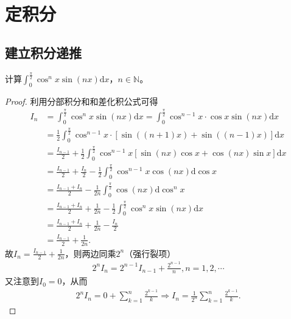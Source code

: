 \documentclass[../../main.tex]{subfiles}
\begin{document}
\section{定积分}

\subsection{建立积分递推}

\begin{example}
计算\(\int_{0}^{\frac{\pi}{2}} \cos^{n}x\sin(nx)\mathrm{d}x\)，\(n \in \mathbb{N}\)。 
\end{example}
\begin{proof}
利用分部积分和和差化积公式可得
\begin{align*}
I_n&=\int_0^{\frac{\pi}{2}}\cos ^nx\sin(nx) \mathrm{d}x=\int_0^{\frac{\pi}{2}}\cos ^{n - 1}x\cdot\cos x\sin(nx) \mathrm{d}x\\
&=\frac{1}{2}\int_0^{\frac{\pi}{2}}\cos ^{n - 1}x\cdot[\sin((n + 1)x)+\sin((n - 1)x)] \mathrm{d}x\\
&=\frac{I_{n - 1}}{2}+\frac{1}{2}\int_0^{\frac{\pi}{2}}\cos ^{n - 1}x[\sin(nx)\cos x+\cos(nx)\sin x] \mathrm{d}x\\
&=\frac{I_{n - 1}}{2}+\frac{I_n}{2}-\frac{1}{2}\int_0^{\frac{\pi}{2}}\cos ^{n - 1}x\cos(nx) \mathrm{d}\cos x\\
&=\frac{I_{n - 1}+I_n}{2}-\frac{1}{2n}\int_0^{\frac{\pi}{2}}\cos(nx) \mathrm{d}\cos ^nx\\
&=\frac{I_{n - 1}+I_n}{2}+\frac{1}{2n}-\frac{1}{2}\int_0^{\frac{\pi}{2}}\cos ^nx\sin(nx) \mathrm{d}x\\
&=\frac{I_{n - 1}+I_n}{2}+\frac{1}{2n}-\frac{I_n}{2}\\
&=\frac{I_{n - 1}}{2}+\frac{1}{2n}.
\end{align*}
故\(I_n=\frac{I_{n - 1}}{2}+\frac{1}{2n}\)，则两边同乘\(2^n\)（强行裂项）
\begin{align*}
2^nI_n = 2^{n - 1}I_{n - 1}+\frac{2^{n - 1}}{n},n = 1,2,\cdots
\end{align*}
又注意到\(I_0 = 0\)，从而
\begin{align*}
2^nI_n = 0+\sum_{k = 1}^n\frac{2^{k - 1}}{k}\Rightarrow I_n=\frac{1}{2^n}\sum_{k = 1}^n\frac{2^{k - 1}}{k}.
\end{align*}

\end{proof}
\end{document}
